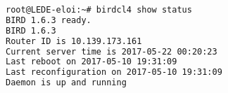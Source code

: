 \begin{lstlisting}[language=bash,caption={UCI Configuration}]
root@LEDE-eloi:~# birdcl4 show status
BIRD 1.6.3 ready.
BIRD 1.6.3
Router ID is 10.139.173.161
Current server time is 2017-05-22 00:20:23
Last reboot on 2017-05-10 19:31:09
Last reconfiguration on 2017-05-10 19:31:09
Daemon is up and running
\end{lstlisting}